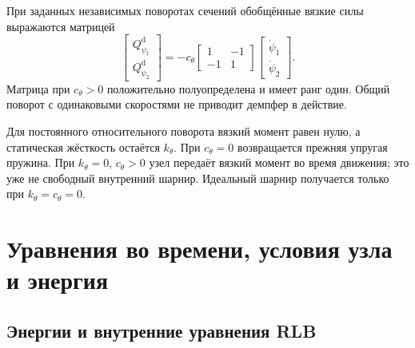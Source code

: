 \documentclass[11pt,a4paper]{article}
\numberwithin{equation}{section}
\newcommand{\kth}{k_\theta}
\newcommand{\cth}{c_\theta}
\begin{document}
При заданных независимых поворотах сечений обобщённые вязкие силы
выражаются матрицей
\begin{equation}
 \begin{bmatrix}Q^{\mathrm d}_{\psi_1}\\Q^{\mathrm d}_{\psi_2}\end{bmatrix}
 =-\cth
 \begin{bmatrix}1&-1\\-1&1\end{bmatrix}
 \begin{bmatrix}\dot\psi_1\\\dot\psi_2\end{bmatrix}.
 \label{eq:dampingmatrix}
\end{equation}
Матрица при $\cth>0$ положительно полуопределена и имеет ранг один.
Общий поворот с одинаковыми скоростями не приводит демпфер в действие.

Для постоянного относительного поворота вязкий момент равен нулю,
а статическая жёсткость остаётся $\kth$. При $\cth=0$ возвращается
прежняя упругая пружина. При $\kth=0$, $\cth>0$ узел передаёт вязкий
момент во время движения; это уже не свободный внутренний шарнир.
Идеальный шарнир получается только при $\kth=\cth=0$.

\section{Уравнения во времени, условия узла и энергия}
\label{sec:balance}

\subsection{Энергии и внутренние уравнения RLB}
\end{document}
